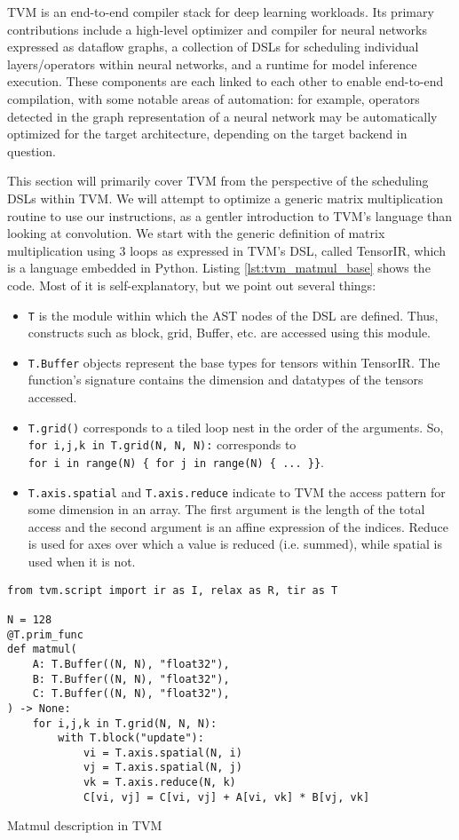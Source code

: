\documentclass[acmsmall, nonacm=true]{acmart}
\begin{document}
TVM\cite{tvm} is an end-to-end compiler stack for deep learning workloads. Its primary contributions include a high-level optimizer and compiler for neural networks expressed as dataflow graphs, a collection of DSLs for scheduling individual layers/operators within neural networks, and a runtime for model inference execution. These components are each linked to each other to enable end-to-end compilation, with some notable areas of automation: for example, operators detected in the graph representation of a neural network may be automatically optimized for the target architecture, depending on the target backend in question.

This section will primarily cover TVM from the perspective of the scheduling DSLs within TVM. We will attempt to optimize a generic matrix multiplication routine to use our instructions, as a gentler introduction to TVM's language than looking at convolution. We start with the generic definition of matrix multiplication using 3 loops as expressed in TVM's DSL, called TensorIR, which is a language embedded in Python. Listing \ref{lst:tvm_matmul_base} shows the code. Most of it is self-explanatory, but we point out several things:

\begin{itemize}
\item \verb|T| is the module within which the AST nodes of the DSL are defined. Thus, constructs such as block, grid, Buffer, etc. are accessed using this module.
\item \verb|T.Buffer| objects represent the base types for tensors within TensorIR. The function's signature contains the dimension and datatypes of the tensors accessed.
\item \verb|T.grid()| corresponds to a tiled loop nest in the order of the arguments. So, \verb|for i,j,k in T.grid(N, N, N):| corresponds to\\ \verb|for i in range(N) { for j in range(N) { ... }}|.
\item \verb|T.axis.spatial| and \verb|T.axis.reduce| indicate to TVM the access pattern for some dimension in an array. The first argument is the length of the total access and the second argument is an affine expression of the indices. Reduce is used for axes over which a value is reduced (i.e. summed), while spatial is used when it is not. 
\end{itemize}


\begin{listing}
    \centering
    \begin{verbatim}
from tvm.script import ir as I, relax as R, tir as T

N = 128
@T.prim_func
def matmul(
    A: T.Buffer((N, N), "float32"),
    B: T.Buffer((N, N), "float32"),
    C: T.Buffer((N, N), "float32"),
) -> None:
    for i,j,k in T.grid(N, N, N):
        with T.block("update"):
            vi = T.axis.spatial(N, i)
            vj = T.axis.spatial(N, j)
            vk = T.axis.reduce(N, k)
            C[vi, vj] = C[vi, vj] + A[vi, vk] * B[vj, vk]
    \end{verbatim}
    \caption{Matmul description in TVM}
    \label{lst:tvm_matmul_base}
\end{listing}
\end{document}
